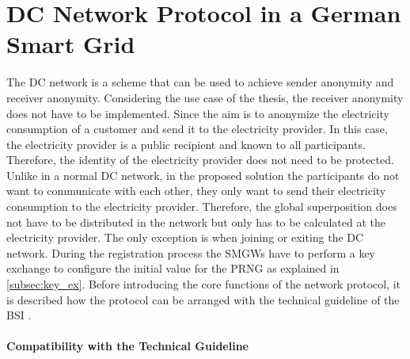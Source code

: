 \section{DC Network Protocol in a German Smart Grid}
The DC network is a scheme that can be used to achieve sender anonymity and receiver anonymity. Considering the use case of the thesis, the receiver anonymity does not have to be implemented. Since the aim is to anonymize the electricity consumption of a customer and send it to the electricity provider. In this case, the electricity provider is a public recipient and known to all participants. Therefore, the identity of the electricity provider does not need to be protected. Unlike in a normal DC network, in the proposed solution the participants do not want to communicate with each other, they only want to send their electricity consumption to the electricity provider. Therefore, the global superposition does not have to be distributed in the network but only has to be calculated at the electricity provider. The only exception is when joining or exiting the DC network.
During the registration process the SMGWs have to perform a key exchange to configure the initial value for the PRNG as explained in \ref{subsec:key_ex}. Before introducing the core functions of the network protocol, it is described how the protocol can be arranged with the technical guideline of the BSI \cite{TR-031}.\\
\\
\textbf{Compatibility with the Technical Guideline}
\\
\\

